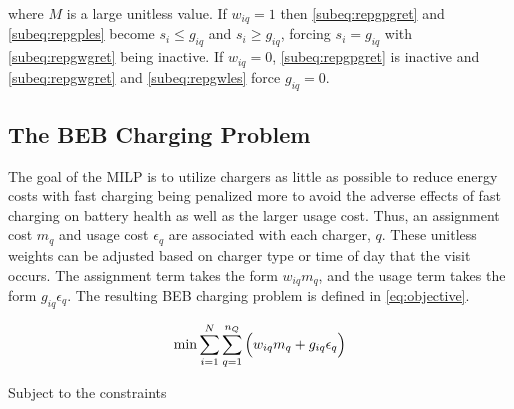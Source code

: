\documentclass[ee,thesis]{usuthesis}
\begin{document}
\noindent where \(M\) is a large unitless value. If \(w_{iq} = 1\) then \autoref{subeq:repgpgret} and
\autoref{subeq:repgples} become \(s_i \leq g_{iq}\) and \(s_i \geq g_{iq}\), forcing \(s_i = g_{iq}\) with \autoref{subeq:repgwgret}
being inactive. If \(w_{iq} = 0\), \autoref{subeq:repgpgret} is inactive and \autoref{subeq:repgwgret} and
\autoref{subeq:repgwles} force \(g_{iq} = 0\).

\subsection{The BEB Charging Problem}
\label{sec:BEB_MILP}
The goal of the MILP is to utilize chargers as little as possible to reduce energy costs with fast charging being
penalized more to avoid the adverse effects of fast charging on battery health as well as the
larger usage cost. Thus, an assignment cost \(m_q\) and usage cost \(\epsilon_q\) are associated with each charger, \(q\).
These unitless weights can be adjusted based on charger type or time of day that the visit
occurs. The assignment term takes the form \(w_{iq}m_q\), and the usage term takes the form \(g_{iq} \epsilon_q\). The
resulting BEB charging problem is defined in \autoref{eq:objective}.

\begin{equation}
\label{eq:objective}
	\min \sum_{i=1}^N \sum_{q=1}^{n_Q} \Big( w_{iq} m_q + g_{iq} \epsilon_q \Big) \\
\end{equation}

Subject to the constraints
\end{document}

